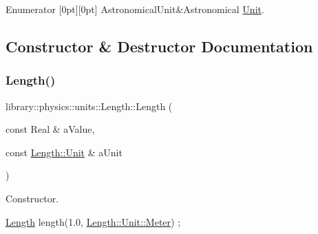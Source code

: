 \begin{DoxyEnumFields}{Enumerator}
[0pt][0pt]{}\mbox{\label{classlibrary_1_1physics_1_1units_1_1_length_a3b8b39cd245cf6b19dc34459baeccb18aa05a35804c7e4fff8e02f5a58782f133}} 
Astronomical\+Unit&Astronomical \hyperlink{classlibrary_1_1physics_1_1units_1_1_unit}{Unit}. \\
\hline

\end{DoxyEnumFields}


\subsection{Constructor \& Destructor Documentation}
\mbox{\label{classlibrary_1_1physics_1_1units_1_1_length_a37acb2579b889c48c526be57208187c6}} 
\subsubsection{\texorpdfstring{Length()}{Length()}}
{\footnotesize\ttfamily library\+::physics\+::units\+::\+Length\+::\+Length (\begin{DoxyParamCaption}\item[{const Real \&}]{a\+Value,  }\item[{const \hyperlink{classlibrary_1_1physics_1_1units_1_1_length_a3b8b39cd245cf6b19dc34459baeccb18}{Length\+::\+Unit} \&}]{a\+Unit }\end{DoxyParamCaption})}



Constructor. 


\begin{DoxyCode}
\hyperlink{classlibrary_1_1physics_1_1units_1_1_length_a37acb2579b889c48c526be57208187c6}{Length} length(1.0, \hyperlink{classlibrary_1_1physics_1_1units_1_1_length_a3b8b39cd245cf6b19dc34459baeccb18a17c9c40b9db5a0983d1075a012c1f90a}{Length::Unit::Meter}) ;
\end{DoxyCode}



